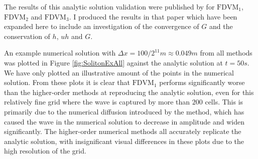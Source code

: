 The results of this analytic solution validation were published by \citet{Zoppou-etal-2017} for $\text{FDVM}_1$, $\text{FDVM}_2$ and $\text{FDVM}_3$. I produced the results in that paper which have been expanded here to include an investigation of the convergence of $G$ and the conservation of $h$, $uh$ and $G$.

An example numerical solution with $\Delta x = {100} / {2^{11}}m \approx 0.049m$ from all methods was plotted in Figure \ref{fig:SolitonExAll} against the analytic solution at $t= 50s$. We have only plotted an illustrative amount of the points in the numerical solution. From these plots it is clear that $\text{FDVM}_1$ performs significantly worse than the higher-order methods at reproducing the analytic solution, even for this relatively fine grid where the wave is captured by more than $200$ cells. This is primarily due to the numerical diffusion introduced by the method, which has caused the wave in the numerical solution to decrease in amplitude and widen significantly. The higher-order numerical methods all accurately replicate the analytic solution, with insignificant visual differences in these plots due to the high resolution of the grid.

